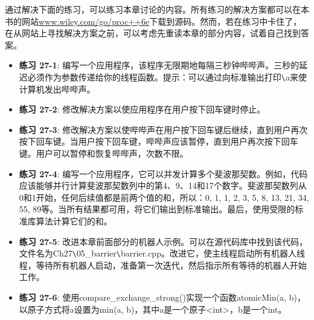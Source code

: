 通过解决下面的练习，可以练习本章讨论的内容。所有练习的解决方案都可以在本书的网站\url{www.wiley.com/go/proc++6e}下载到源码。然而，若在练习中卡住了，在从网站上寻找解决方案之前，可以考虑先重读本章的部分内容，试着自己找到答案。

\begin{itemize}
\item
\textbf{练习 27-1}: 编写一个应用程序，该程序无限期地每隔三秒钟哔哔声。三秒的延迟必须作为参数传递给你的线程函数。提示：可以通过向标准输出打印\verb|\|a来使计算机发出哔哔声。

\item
\textbf{练习 27-2}: 修改解决方案以使应用程序在用户按下回车键时停止。

\item
\textbf{练习 27-3}: 修改解决方案以使哔哔声在用户按下回车键后继续，直到用户再次按下回车键。当用户按下回车键，哔哔声应该暂停，直到用户再次按下回车键。用户可以暂停和恢复哔哔声，次数不限。

\item
\textbf{练习 27-4}: 编写一个应用程序，它可以并发计算多个斐波那契数。例如，代码应该能够并行计算斐波那契数列中的第4、9、14和17个数字。斐波那契数列从0和1开始，任何后续值都是前两个值的和，所以：0, 1, 1, 2, 3, 5, 8, 13, 21, 34, 55, 89等。当所有结果都可用，将它们输出到标准输出。最后，使用受限的标准库算法计算它们的和。

\item
\textbf{练习 27-5}: 改进本章前面部分的机器人示例。可以在源代码库中找到该代码，文件名为Ch27\verb|\|05\_barrier\verb|\|barrier.cpp。改进它，使主线程启动所有机器人线程，等待所有机器人启动，准备第一次迭代，然后指示所有等待的机器人开始工作。

\item
\textbf{练习 27-6}: 使用compare\_exchange\_strong()实现一个函数atomicMin(a, b)，以原子方式将a设置为min(a, b)，其中a是一个原子<int>，b是一个int。
\end{itemize}







